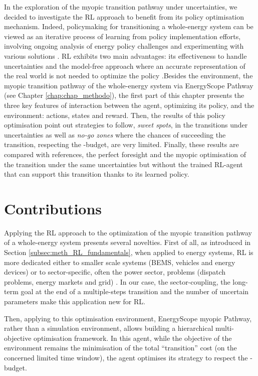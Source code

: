 In the exploration of the myopic transition pathway under uncertainties, we decided to investigate the \gls{RL} approach to benefit from its policy optimisation mechanism. Indeed, policymaking for transitioning a whole-energy system can be viewed as an iterative process of learning from policy implementation efforts, involving ongoing analysis of energy policy challenges and experimenting with various solutions \cite{howlett1995studying}. \gls{RL} exhibits two main advantages: its effectiveness to handle uncertainties and the model-free approach where an accurate representation of the real world is not needed to optimize the policy \cite{perera2021applications}.Besides the environment, \ie the myopic transition pathway of the whole-energy system via EnergyScope Pathway (see Chapter \ref{chap:chap_methodo}), the first part of this chapter presents the three key features of interaction between the agent, optimizing its policy, and the environment: actions, states and reward.  Then, the results of this policy optimisation point out strategies to follow, \ie \textit{sweet spots}, in the transitions under uncertainties as well as \textit{no-go zones} where the chances of succeeding the transition, \ie respecting the -budget, are very limited. Finally, these results are compared with references, \ie the perfect foresight and the myopic optimisation of the transition under the same uncertainties but without the trained \gls{RL}-agent that can support this transition thanks to its learned policy.

\section*{Contributions}
\label{sec:meth:contributions}
Applying the \gls{RL} approach to the optimization of the myopic transition pathway of a whole-energy system presents several novelties. First of all, as introduced in Section \ref{subsec:meth_RL_fundamentals}, when applied to energy systems, \gls{RL} is more dedicated either to smaller scale systems (\eg \gls{BEMS}, vehicles and energy devices) or to sector-specific, often the power sector, problems (\eg dispatch problems, energy markets and grid) \cite{perera2021applications}. In our case, the sector-coupling, the long-term goal at the end of a multiple-steps transition and the number of uncertain parameters make this application new for \gls{RL}.

Then, applying to this optimisation environment, \ie EnergyScope myopic Pathway,  rather than a simulation environment, allows building a hierarchical multi-objective optimisation framework. In this agent, while the objective of the environment remains the minimisation of the total ``transition'' cost (on the concerned limited time window), the agent optimises its strategy to respect the -budget. 

